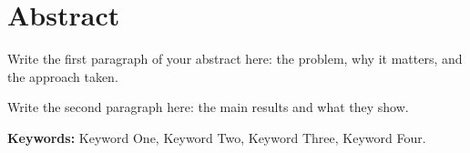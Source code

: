 
\chapter*{Abstract}

Write the first paragraph of your abstract here: the problem, why it matters, and the approach taken.

Write the second paragraph here: the main results and what they show.\\


\par
\textbf{Keywords:} Keyword One, Keyword Two, Keyword Three, Keyword Four.

